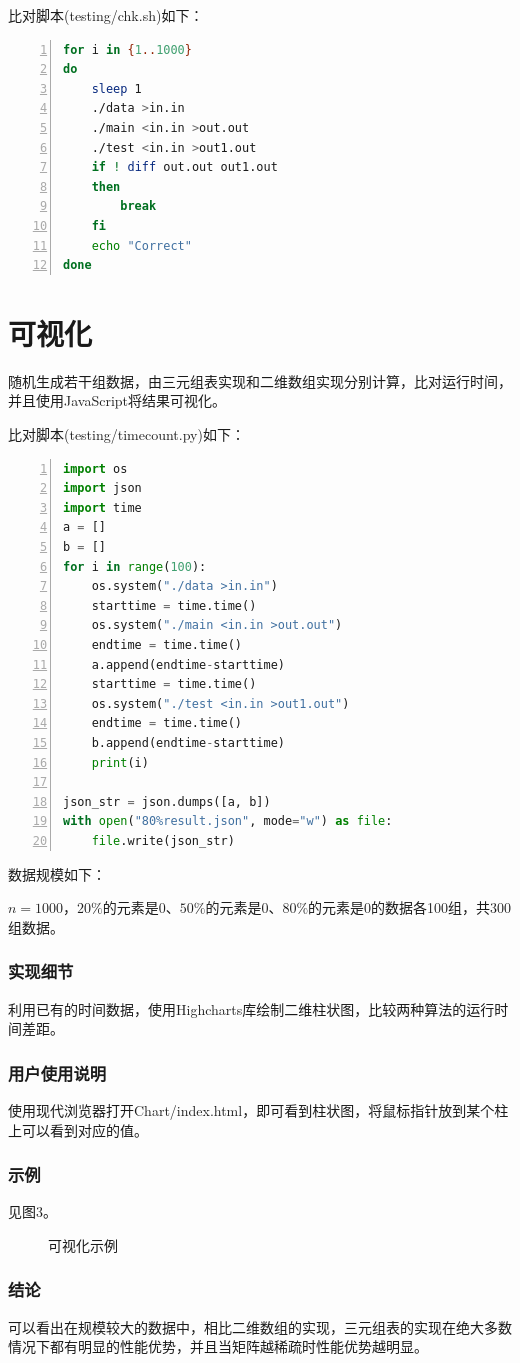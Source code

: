 \documentclass{article}
\begin{document}
比对脚本(testing/chk.sh)如下：

\begin{lstlisting}[language={bash},
    numbers=left,
    numberstyle=\tiny\consolas,
    basicstyle=\small\consolas]
for i in {1..1000}
do
    sleep 1
    ./data >in.in
    ./main <in.in >out.out
    ./test <in.in >out1.out
    if ! diff out.out out1.out
    then
        break
    fi
    echo "Correct"
done
\end{lstlisting}

\section{可视化}

随机生成若干组数据，由三元组表实现和二维数组实现分别计算，比对运行时间，并且使用JavaScript将结果可视化。

比对脚本(testing/timecount.py)如下：

\begin{lstlisting}[language={python},
    numbers=left,
    numberstyle=\tiny\consolas,
    basicstyle=\small\consolas]
import os
import json
import time
a = []
b = []
for i in range(100):
    os.system("./data >in.in")
    starttime = time.time()
    os.system("./main <in.in >out.out")
    endtime = time.time()
    a.append(endtime-starttime)
    starttime = time.time()
    os.system("./test <in.in >out1.out")
    endtime = time.time()
    b.append(endtime-starttime)
    print(i)

json_str = json.dumps([a, b])
with open("80%result.json", mode="w") as file:
    file.write(json_str)
\end{lstlisting}

数据规模如下：

$n=1000$，$20\%$的元素是0、$50\%$的元素是0、$80\%$的元素是0的数据各100组，共300组数据。

\subsubsection{实现细节}

利用已有的时间数据，使用Highcharts库绘制二维柱状图，比较两种算法的运行时间差距。

\subsubsection{用户使用说明}

使用现代浏览器打开Chart/index.html，即可看到柱状图，将鼠标指针放到某个柱上可以看到对应的值。

\subsubsection{示例}

见图3。

\begin{figure}[htbp]
    
    
    \caption{可视化示例}
    
\end{figure}

\subsubsection{结论}

可以看出在规模较大的数据中，相比二维数组的实现，三元组表的实现在绝大多数情况下都有明显的性能优势，并且当矩阵越稀疏时性能优势越明显。
\end{document}
